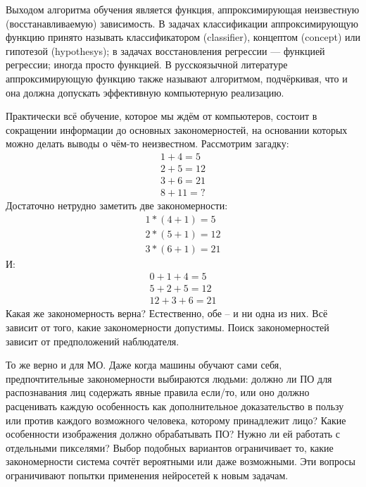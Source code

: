 \documentclass[a4paper, 12pt]{article}
\begin{document}
    Выходом алгоритма обучения является функция, аппроксимирующая неизвестную (восстанавливаемую) зависимость. В задачах классификации аппроксимирующую функцию принято называть классификатором (classifier), концептом (concept) или гипотезой (hypothesys); в задачах восстановления регрессии — функцией регрессии; иногда просто функцией. В русскоязычной литературе аппроксимирующую функцию также называют алгоритмом, подчёркивая, что и она должна допускать эффективную компьютерную реализацию.
	
	Практически всё обучение, которое мы ждём от компьютеров, состоит в сокращении информации до основных закономерностей, на основании которых можно делать выводы о чём-то неизвестном. Рассмотрим загадку:
	\begin{equation*}
		\begin{gathered}
		1 + 4 = 5\\
		2 + 5 = 12\\
		3 + 6 = 21\\
		8 + 11 =?
		\end{gathered}
	\end{equation*}
	Достаточно нетрудно заметить две закономерности:
	\begin{equation*}
		\begin{gathered}
		1 * (4 + 1) = 5\\
		2 * (5 + 1) = 12\\
		3 * (6 + 1) = 21
		\end{gathered}
	\end{equation*}
	И:
	\begin{equation*}
		\begin{gathered}
		0 + 1 + 4 = 5\\
		5 + 2 + 5 = 12\\
		12 + 3 + 6 = 21
		\end{gathered}
	\end{equation*}
	Какая же закономерность верна? Естественно, обе – и ни одна из них. Всё зависит от того, какие закономерности допустимы. Поиск закономерностей зависит от предположений наблюдателя.

	То же верно и для МО. Даже когда машины обучают сами себя, предпочтительные закономерности выбираются людьми: должно ли ПО для распознавания лиц содержать явные правила если/то, или оно должно расценивать каждую особенность как дополнительное доказательство в пользу или против каждого возможного человека, которому принадлежит лицо? Какие особенности изображения должно обрабатывать ПО? Нужно ли ей работать с отдельными пикселями? Выбор подобных вариантов ограничивает то, какие закономерности система сочтёт вероятными или даже возможными. Эти вопросы ограничивают попытки применения нейросетей к новым задачам.
\end{document}
